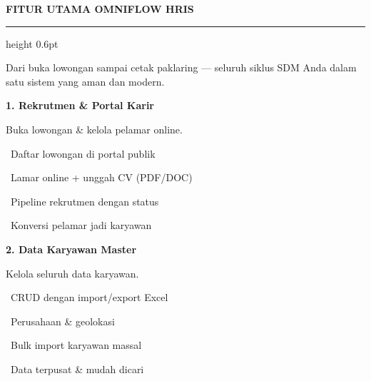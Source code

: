 \documentclass[a4paper]{article}
\newcommand{\sectiontitle}[1]{%
    \vspace{10pt}%
    {\fontsize{13}{16}\selectfont\bfseries\color{BlueDark} #1}\par\vspace{3pt}%
    {\color{BluePrimary}\hrule height 0.6pt}\par\vspace{8pt}%
}
\begin{document}
\sectiontitle{FITUR UTAMA OMNIFLOW HRIS}

{\fontsize{9.5}{13}\selectfont\color{TextLight} Dari buka lowongan sampai cetak paklaring --- seluruh siklus SDM Anda dalam satu sistem yang aman dan modern.}

\vspace{6pt}

\noindent
\begin{minipage}[t]{0.485\textwidth}
    \colorbox{BluePrimary}{%
        \begin{minipage}{\dimexpr\textwidth-2\fboxsep\relax}
            {\fontsize{10}{13}\selectfont\bfseries\color{White} 1. Rekrutmen \& Portal Karir}
        \end{minipage}}\par
    \vspace{4pt}
    {\fontsize{9}{12}\selectfont\color{TextDark}%
    Buka lowongan \& kelola pelamar online.\par\vspace{3pt}
    \textbullet\ Daftar lowongan di portal publik\par\vspace{2pt}%
    \textbullet\ Lamar online + unggah CV (PDF/DOC)\par\vspace{2pt}%
    \textbullet\ Pipeline rekrutmen dengan status\par\vspace{2pt}%
    \textbullet\ Konversi pelamar jadi karyawan}%

\end{minipage}%
\hfill
\begin{minipage}[t]{0.485\textwidth}
    \colorbox{EmeraldPrimary}{%
        \begin{minipage}{\dimexpr\textwidth-2\fboxsep\relax}
            {\fontsize{10}{13}\selectfont\bfseries\color{White} 2. Data Karyawan Master}
        \end{minipage}}\par
    \vspace{4pt}
    {\fontsize{9}{12}\selectfont\color{TextDark}%
    Kelola seluruh data karyawan.\par\vspace{3pt}
    \textbullet\ CRUD dengan import/export Excel\par\vspace{2pt}%
    \textbullet\ Perusahaan \& geolokasi\par\vspace{2pt}%
    \textbullet\ Bulk import karyawan massal\par\vspace{2pt}%
    \textbullet\ Data terpusat \& mudah dicari}%

\end{minipage}
\end{document}
